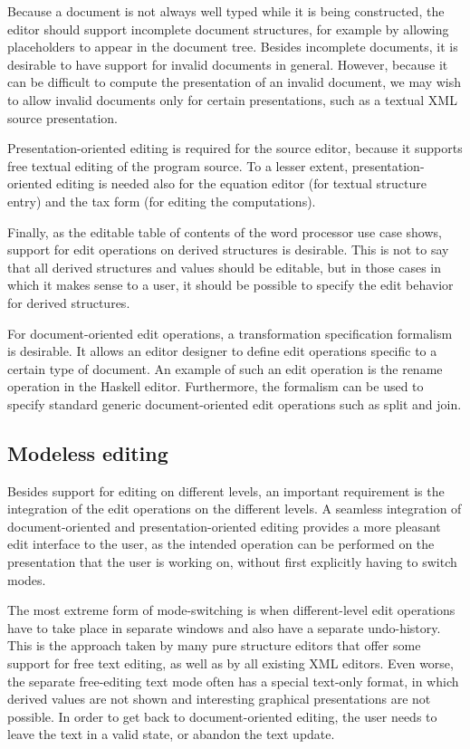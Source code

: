Because a document is not always well typed while it is being constructed, the editor should support incomplete document structures, for example by allowing placeholders to appear in the document tree. Besides incomplete documents, it is desirable to have support for invalid documents in general. However, because it can be difficult to compute the presentation of an invalid document, we may wish to allow invalid documents only for certain presentations, such as a textual XML source presentation. 

Presentation-oriented editing is required for the source editor, because it supports free textual editing of the program source. To a lesser extent, presentation-oriented editing is needed also for the equation editor (for textual structure entry) and the tax form (for editing the computations). 

Finally, as the editable table of contents of the word processor use case shows, support for edit operations on derived structures is desirable. This is not to say that all derived structures and values should be editable, but in those cases in which it makes sense to a user, it should be possible to specify the edit behavior for derived structures.

For document-oriented edit operations, a transformation specification formalism is desirable. It allows an editor designer to define edit operations specific to a certain type of document. An example of such an edit operation is the rename operation in the Haskell editor. Furthermore, the formalism can be used to specify standard generic document-oriented edit operations such as split and join.


%																
\subsection{Modeless editing}

Besides support for editing on different levels, an important requirement is the integration of the edit operations on the different levels. A seamless integration of document-oriented and presentation-oriented editing provides a more pleasant edit interface to the user, as the intended operation can be performed on the presentation that the user is working on, without first explicitly having to switch modes.

The most extreme form of mode-switching is when different-level edit operations have to take place in separate windows and also have a separate undo-history. This is the approach taken by many pure structure editors that offer some support for free text editing, as well as by all existing XML editors. Even worse, the separate free-editing text mode often has a special text-only format, in which derived values are not shown and interesting graphical presentations are not possible. In order to get back to document-oriented editing, the user needs to leave the text in a valid state, or abandon the text update.

